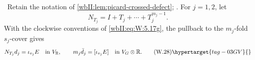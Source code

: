 \begin{lemma}
\hypertarget{tag-03IE}{}\label{wbII:lem:picard-finite-norm}

\ Retain the notation of
\cref{wbII:lem:picard-crossed-defect}; .  For
$j=1,2$, let
\[
 N_{T_j}=I+T_j+\cdots+T_j^{m_j-1}.
\]
With the clockwise conventions of \eqref{wbII:eq:W:5.17g}, the pullback to the
$m_j$-fold $s_j$-cover gives
\[
 N_{T_j}d_j=\iota_{v_j}E
 \quad\text{in }V_{\mathbb R},
\qquad
 m_j\bar d_j=[\iota_{v_j}E]
 \quad\text{in }V_G\otimes\mathbb R.
\tag{W.28}\hypertarget{tag-03GV}{}\label{wbII:eq:W:5.17k}
\]
\end{lemma}



